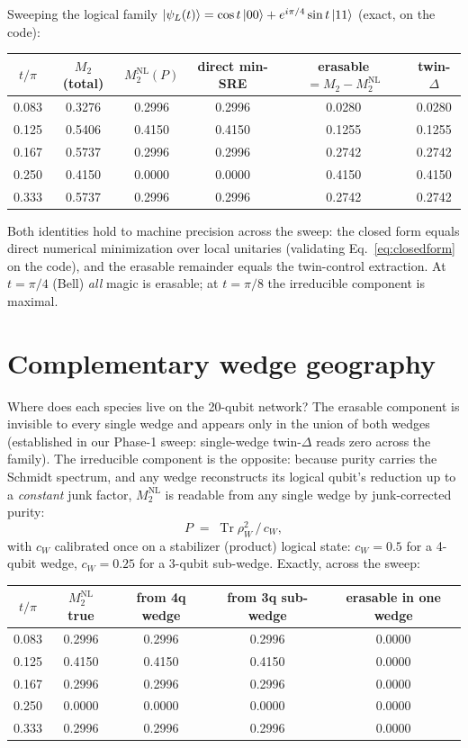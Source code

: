 \documentclass[11pt]{article}
\newcommand{\Mtwo}{M_2}
\newcommand{\NL}{\Mtwo^{\mathrm{NL}}}
\begin{document}
Sweeping the logical family $\ket{\psi_L(t)}=\cos t\ket{00}+e^{i\pi/4}\sin
t\ket{11}$ (exact, on the code):

\begin{center}
\small
\begin{tabular}{cccccc}
\hline
$t/\pi$ & $\Mtwo$ (total) & $\NL(P)$ & direct min-SRE & erasable $=\Mtwo-\NL$ & twin-$\Delta$\\
\hline
0.083 & 0.3276 & 0.2996 & 0.2996 & 0.0280 & 0.0280\\
0.125 & 0.5406 & 0.4150 & 0.4150 & 0.1255 & 0.1255\\
0.167 & 0.5737 & 0.2996 & 0.2996 & 0.2742 & 0.2742\\
0.250 & 0.4150 & 0.0000 & 0.0000 & 0.4150 & 0.4150\\
0.333 & 0.5737 & 0.2996 & 0.2996 & 0.2742 & 0.2742\\
\hline
\end{tabular}
\end{center}

Both identities hold to machine precision across the sweep: the closed form
equals direct numerical minimization over local unitaries (validating
Eq.~\eqref{eq:closedform} on the code), and the erasable remainder equals the
twin-control extraction. At $t=\pi/4$ (Bell) \emph{all} magic is erasable; at
$t=\pi/8$ the irreducible component is maximal.

\section{Complementary wedge geography}

Where does each species live on the 20-qubit network? The erasable component is
invisible to every single wedge and appears only in the union of both wedges
(established in our Phase-1 sweep: single-wedge twin-$\Delta$ reads zero across
the family). The irreducible component is the opposite: because purity carries
the Schmidt spectrum, and any wedge reconstructs its logical qubit's reduction
up to a \emph{constant} junk factor, $\NL$ is readable from any single wedge by
junk-corrected purity:
\begin{equation}
  P \;=\; \operatorname{Tr}\rho_{W}^2 \,/\, c_W,
\end{equation}
with $c_W$ calibrated once on a stabilizer (product) logical state:
$c_{W}=0.5$ for a 4-qubit wedge, $c_{W}=0.25$ for a 3-qubit sub-wedge. Exactly,
across the sweep:

\begin{center}
\small
\begin{tabular}{ccccc}
\hline
$t/\pi$ & $\NL$ true & from 4q wedge & from 3q sub-wedge & erasable in one wedge\\
\hline
0.083 & 0.2996 & 0.2996 & 0.2996 & 0.0000\\
0.125 & 0.4150 & 0.4150 & 0.4150 & 0.0000\\
0.167 & 0.2996 & 0.2996 & 0.2996 & 0.0000\\
0.250 & 0.0000 & 0.0000 & 0.0000 & 0.0000\\
0.333 & 0.2996 & 0.2996 & 0.2996 & 0.0000\\
\hline
\end{tabular}
\end{center}
\end{document}
